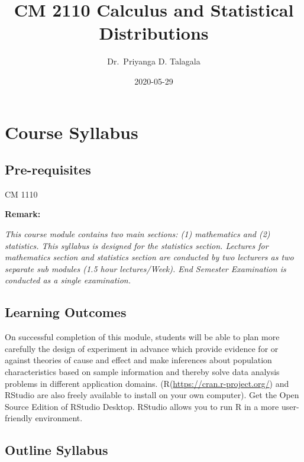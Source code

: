 \documentclass[]{book}
\title{CM 2110 Calculus and Statistical Distributions}
\author{Dr.~Priyanga D. Talagala}
\date{2020-05-29}
\begin{document}
\maketitle

{
\setcounter{tocdepth}{1}
\tableofcontents
}
\hypertarget{course-syllabus}{%
\chapter*{Course Syllabus}\label{course-syllabus}}

\hypertarget{pre-requisites}{%
\section*{Pre-requisites}\label{pre-requisites}}

CM 1110

\textbf{Remark:}

\emph{This course module contains two main sections: (1) mathematics and (2) statistics. This syllabus is designed for the statistics section. Lectures for mathematics section and statistics section are conducted by two lecturers as two separate sub modules (1.5 hour lectures/Week). End Semester Examination is conducted as a single examination.}

\hypertarget{learning-outcomes}{%
\section*{Learning Outcomes}\label{learning-outcomes}}

On successful completion of this module, students will be able to plan more carefully the design of experiment in advance which provide evidence for or against theories of cause and effect and make inferences about population characteristics based on sample information and thereby solve data analysis problems in different application domains. (R(\url{https://cran.r-project.org/}) and RStudio are also freely available to install on your own computer). Get the Open Source Edition of RStudio Desktop. RStudio allows you to run R in a more user-friendly environment.

\hypertarget{outline-syllabus}{%
\section*{Outline Syllabus}\label{outline-syllabus}}
\end{document}
